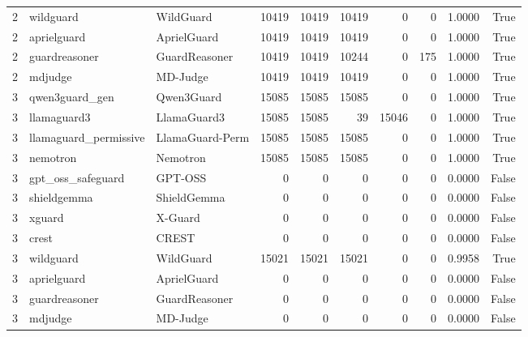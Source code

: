 \begin{tabular}{rllrrrrrrr}
2 & wildguard & WildGuard & 10419 & 10419 & 10419 & 0 & 0 & 1.0000 & True \\
2 & aprielguard & AprielGuard & 10419 & 10419 & 10419 & 0 & 0 & 1.0000 & True \\
2 & guardreasoner & GuardReasoner & 10419 & 10419 & 10244 & 0 & 175 & 1.0000 & True \\
2 & mdjudge & MD-Judge & 10419 & 10419 & 10419 & 0 & 0 & 1.0000 & True \\
3 & qwen3guard\_gen & Qwen3Guard & 15085 & 15085 & 15085 & 0 & 0 & 1.0000 & True \\
3 & llamaguard3 & LlamaGuard3 & 15085 & 15085 & 39 & 15046 & 0 & 1.0000 & True \\
3 & llamaguard\_permissive & LlamaGuard-Perm & 15085 & 15085 & 15085 & 0 & 0 & 1.0000 & True \\
3 & nemotron & Nemotron & 15085 & 15085 & 15085 & 0 & 0 & 1.0000 & True \\
3 & gpt\_oss\_safeguard & GPT-OSS & 0 & 0 & 0 & 0 & 0 & 0.0000 & False \\
3 & shieldgemma & ShieldGemma & 0 & 0 & 0 & 0 & 0 & 0.0000 & False \\
3 & xguard & X-Guard & 0 & 0 & 0 & 0 & 0 & 0.0000 & False \\
3 & crest & CREST & 0 & 0 & 0 & 0 & 0 & 0.0000 & False \\
3 & wildguard & WildGuard & 15021 & 15021 & 15021 & 0 & 0 & 0.9958 & True \\
3 & aprielguard & AprielGuard & 0 & 0 & 0 & 0 & 0 & 0.0000 & False \\
3 & guardreasoner & GuardReasoner & 0 & 0 & 0 & 0 & 0 & 0.0000 & False \\
3 & mdjudge & MD-Judge & 0 & 0 & 0 & 0 & 0 & 0.0000 & False \\
\bottomrule
\end{tabular}
